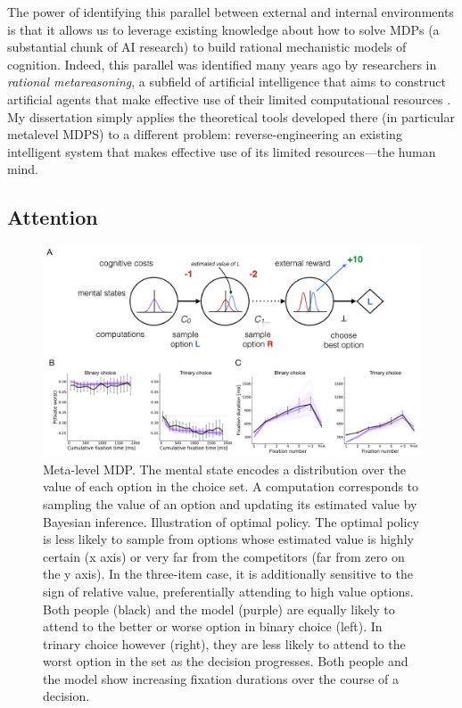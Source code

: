 \documentclass[11pt,a4paperpaper,]{article}
\begin{document}
The power of identifying this parallel between external and internal environments is that it allows us to leverage existing knowledge about how to solve MDPs (a substantial chunk of AI research) to build rational mechanistic models of cognition. Indeed, this parallel was identified many years ago by researchers in \emph{rational metareasoning}, a subfield of artificial intelligence that aims to construct artificial agents that make effective use of their limited computational resources \citep{russell1991principles,hay2016principles}. My dissertation simply applies the theoretical tools developed there (in particular metalevel MDPS) to a different problem: reverse-engineering an existing intelligent system that makes effective use of its limited resources---the human mind.

\subsection{Attention}

\begin{figure}[th]
  \centering
  \includegraphics[width=\textwidth]{diagrams/precis/attention.pdf}
  \caption{
     Meta-level MDP. The mental state encodes a distribution over the value of each option in the choice set. A computation corresponds to sampling the value of an option and updating its estimated value by Bayesian inference.
     Illustration of optimal policy. The optimal policy is less likely to sample from options whose estimated value is highly certain (x axis) or very far from the competitors (far from zero on the y axis). In the three-item case, it is additionally sensitive to the sign of relative value, preferentially attending to high value options.
     Both people (black) and the model (purple) are equally likely to attend to the better or worse option in binary choice (left). In trinary choice however (right), they are less likely to attend to the worst option in the set as the decision progresses.
     Both people and the model show increasing fixation durations over the course of a decision.
  }
  \label{fig:attention}
\end{figure}
\end{document}
